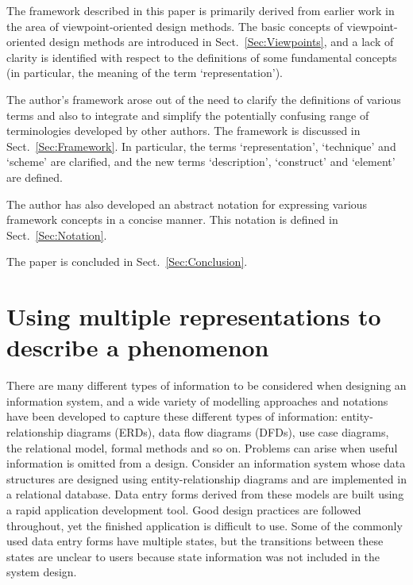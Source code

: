 \documentclass[11pt,oribibl]{llncs}
\begin{document}
The framework described in this paper is primarily derived from earlier work in the area of viewpoint-oriented design methods. The basic concepts of viewpoint-oriented design methods are introduced in Sect.~\ref{Sec:Viewpoints}, and a lack of clarity is identified with respect to the definitions of some fundamental concepts (in particular, the meaning of the term `representation').

The author's framework arose out of the need to clarify the definitions of various terms and also to integrate and simplify the potentially confusing range of terminologies developed by other authors. The framework is discussed in Sect.~\ref{Sec:Framework}. In particular, the terms `representation', `technique' and `scheme' are clarified, and the new terms `description', `construct' and `element' are defined.

The author has also developed an abstract notation for expressing various framework concepts in a concise manner. This notation is defined in Sect.~\ref{Sec:Notation}.

The paper is concluded in Sect.~\ref{Sec:Conclusion}.


\section{Using multiple representations to describe a phenomenon}
\label{Sec:MultipleRepresentations}

There are many different types of information to be considered when designing an information system, and a wide variety of modelling approaches and notations have been developed to capture these different types of information: entity-relationship diagrams (ERDs), data flow diagrams (DFDs), use case diagrams, the relational model, formal methods and so on. Problems can arise when useful information is omitted from a design. Consider an information system whose data structures are designed using entity-relationship diagrams and are implemented in a relational database. Data entry forms derived from these models are built using a rapid application development tool. Good design practices are followed throughout, yet the finished application is difficult to use. Some of the commonly used data entry forms have multiple states, but the transitions between these states are unclear to users because state information was not included in the system design.
\end{document}
